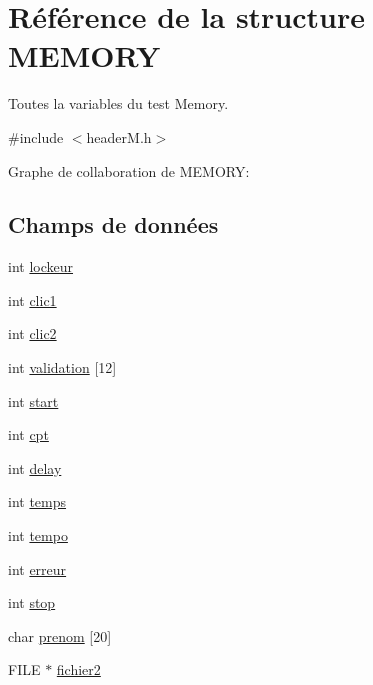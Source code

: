 \hypertarget{struct_m_e_m_o_r_y}{}\section{Référence de la structure M\+E\+M\+O\+RY}
\label{struct_m_e_m_o_r_y}


Toutes la variables du test Memory.  




{\ttfamily \#include $<$header\+M.\+h$>$}



Graphe de collaboration de M\+E\+M\+O\+RY\+:
\subsection*{Champs de données}
\begin{DoxyCompactItemize}
\item 
int \hyperlink{struct_m_e_m_o_r_y_afaf951f31958ae29b257a200d1097ae0}{lockeur}
\item 
int \hyperlink{struct_m_e_m_o_r_y_aa6bcbbf0ed10325dfe7fce1e61e7c9ed}{clic1}
\item 
int \hyperlink{struct_m_e_m_o_r_y_a68f0f859c6ae5c991ec4e5f0b98d93e9}{clic2}
\item 
int \hyperlink{struct_m_e_m_o_r_y_a450eaf3090c596674dde1786a71ea9d4}{validation} \mbox{[}12\mbox{]}
\item 
int \hyperlink{struct_m_e_m_o_r_y_a29f694b7714a58d55e9b7c06480c9b93}{start}
\item 
int \hyperlink{struct_m_e_m_o_r_y_a91c7367ce7eb09e409da16ec4d733313}{cpt}
\item 
int \hyperlink{struct_m_e_m_o_r_y_a9930314917a947ebc150ea3e96ab752a}{delay}
\item 
int \hyperlink{struct_m_e_m_o_r_y_a7d203f387ea4eb67c8102e8e87ff8fd1}{temps}
\item 
int \hyperlink{struct_m_e_m_o_r_y_a4f79ed479e9443011fb8aae0244fadd0}{tempo}
\item 
int \hyperlink{struct_m_e_m_o_r_y_af86682453d5ac761179a10bf220efcda}{erreur}
\item 
int \hyperlink{struct_m_e_m_o_r_y_aeebed2e935c7e36b7ee23a5f699dae0b}{stop}
\item 
char \hyperlink{struct_m_e_m_o_r_y_a0b33653d2a999660bd3c639eabe6caef}{prenom} \mbox{[}20\mbox{]}
\item 
F\+I\+LE $\ast$ \hyperlink{struct_m_e_m_o_r_y_a54be37399da65f11266e2ed5f359c109}{fichier2}
\item 

\end{DoxyCompactItemize}
